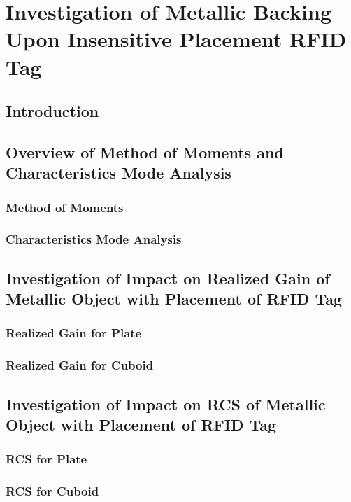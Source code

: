 \documentclass[12pt,onecolumn]{report}
\begin{document}
\chapter{Investigation of Metallic Backing Upon  Insensitive Placement RFID Tag}
    \section{Introduction}
    \section{Overview of Method of Moments and Characteristics Mode Analysis}
        \subsection{Method of Moments}
        \subsection{Characteristics Mode Analysis}
    \section{Investigation of Impact on Realized Gain of Metallic Object with Placement of RFID Tag}
        \subsection{Realized Gain for Plate}
        \subsection{Realized Gain for Cuboid}
    \section{Investigation of Impact on RCS of Metallic Object with Placement of RFID Tag}
        \subsection{RCS for Plate}
        \subsection{RCS for Cuboid}
\end{document}
